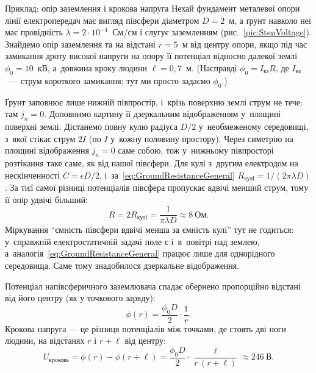 \begin{Example}{Приклад: опір заземлення і крокова напруга}
Нехай фундамент металевої опори лінії електропередач має вигляд півсфери діаметром $D=2$~м, а ґрунт навколо неї має провідність
$\lambda = 2\cdot10^{-4}$~См/см і слугує заземленням (рис.~\ref{pic:StepVoltage}). Знайдемо опір заземлення та  на відстані
$r=5$~м від центру опори, якщо під час замикання дроту високої напруги на опору її потенціал відносно далекої землі
$\phi_0=10$~кВ, а~довжина кроку людини $\ell=0{,}7$~м. (Насправді $\phi_0 = I_\text{кз}R$, де $I_\text{кз}$~--- струм короткого
замикання; тут ми просто задаємо $\phi_0$.)

Ґрунт заповнює лише нижній півпростір, і~крізь поверхню землі струм не тече: там $j_n = 0$. Доповнимо картину її дзеркальним
відображенням у~площині поверхні землі. Дістанемо повну кулю радіуса $D/2$ у~необмеженому середовищі, з~якої стікає струм $2I$
(по $I$ у~кожну половину простору). Через симетрію на площині відображення $j_n = 0$ саме собою, тож у~нижньому півпросторі
розтікання таке саме, як від нашої півсфери. Для кулі з~другим електродом на нескінченності $C = \epsilon D/2$, і~за~\eqref{eq:GroundResistanceGeneral}
$R_\text{кулі} = 1/(2\pi\lambda D)$. За тієї самої різниці потенціалів півсфера пропускає вдвічі менший струм, тому її опір
удвічі більший:
\begin{equation*}
	R = 2R_\text{кулі} = \frac{1}{\pi\lambda D} \approx 8\ \text{Ом}.
\end{equation*}
Міркування \enquote{ємність півсфери вдвічі менша за ємність кулі} тут не годиться: у~справжній електростатичній задачі поле є
і~в~повітрі над землею, а~аналогія~\eqref{eq:GroundResistanceGeneral} працює лише для однорідного середовища. Саме тому знадобилося
дзеркальне відображення.

Потенціал напівсферичного заземлювача спадає обернено пропорційно відстані від його центру (як у точкового заряду):
\begin{equation*}
	\phi(r) = \frac{\phi_0 D}{2}\cdot\frac1r.
\end{equation*}
Крокова напруга --- це різниця потенціалів між точками, де стоять дві ноги людини, на відстанях $r$ і $r+\ell$ від центру:
\begin{equation*}
	U_\text{крокова} = \phi(r) - \phi(r+\ell) = \frac{\phi_0 D}{2}\cdot\frac{\ell}{r\,(r+\ell)} \approx 246\ \text{В}.
\end{equation*}
\end{Example}

